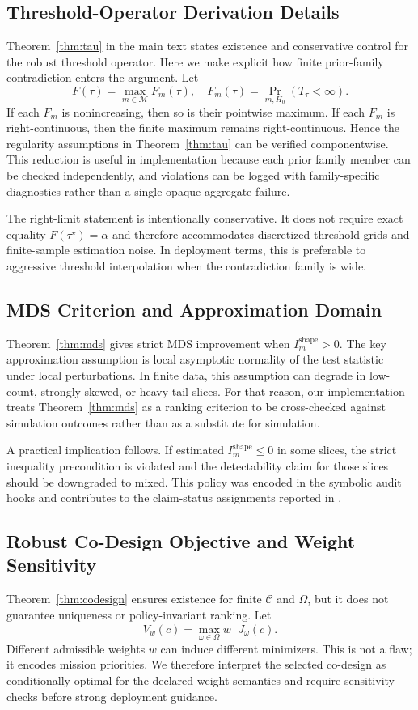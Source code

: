 \documentclass{article} %
\begin{document}
\subsection{Threshold-Operator Derivation Details}
Theorem~\ref{thm:tau} in the main text states existence and conservative control for the robust threshold operator. Here we make explicit how finite prior-family contradiction enters the argument. Let
\[
F(\tau)=\max_{m\in\mathcal{M}} F_m(\tau),\quad F_m(\tau)=\Pr_{m,H_0}(T_\tau<\infty).
\]
If each $F_m$ is nonincreasing, then so is their pointwise maximum. If each $F_m$ is right-continuous, then the finite maximum remains right-continuous. Hence the regularity assumptions in Theorem~\ref{thm:tau} can be verified componentwise. This reduction is useful in implementation because each prior family member can be checked independently, and violations can be logged with family-specific diagnostics rather than a single opaque aggregate failure.

The right-limit statement is intentionally conservative. It does not require exact equality $F(\tau^\star)=\alpha$ and therefore accommodates discretized threshold grids and finite-sample estimation noise. In deployment terms, this is preferable to aggressive threshold interpolation when the contradiction family is wide.

\subsection{MDS Criterion and Approximation Domain}
Theorem~\ref{thm:mds} gives strict MDS improvement when $I_m^{\mathrm{shape}}>0$. The key approximation assumption is local asymptotic normality of the test statistic under local perturbations. In finite data, this assumption can degrade in low-count, strongly skewed, or heavy-tail slices. For that reason, our implementation treats Theorem~\ref{thm:mds} as a ranking criterion to be cross-checked against simulation outcomes rather than as a substitute for simulation.

A practical implication follows. If estimated $I_m^{\mathrm{shape}}\le 0$ in some slices, the strict inequality precondition is violated and the detectability claim for those slices should be downgraded to mixed. This policy was encoded in the symbolic audit hooks and contributes to the claim-status assignments reported in .

\subsection{Robust Co-Design Objective and Weight Sensitivity}
Theorem~\ref{thm:codesign} ensures existence for finite $\mathcal{C}$ and $\Omega$, but it does not guarantee uniqueness or policy-invariant ranking. Let
\[
V_w(c)=\max_{\omega\in\Omega} w^\top J_\omega(c).
\]
Different admissible weights $w$ can induce different minimizers. This is not a flaw; it encodes mission priorities. We therefore interpret the selected co-design as conditionally optimal for the declared weight semantics and require sensitivity checks before strong deployment guidance.
\end{document}
